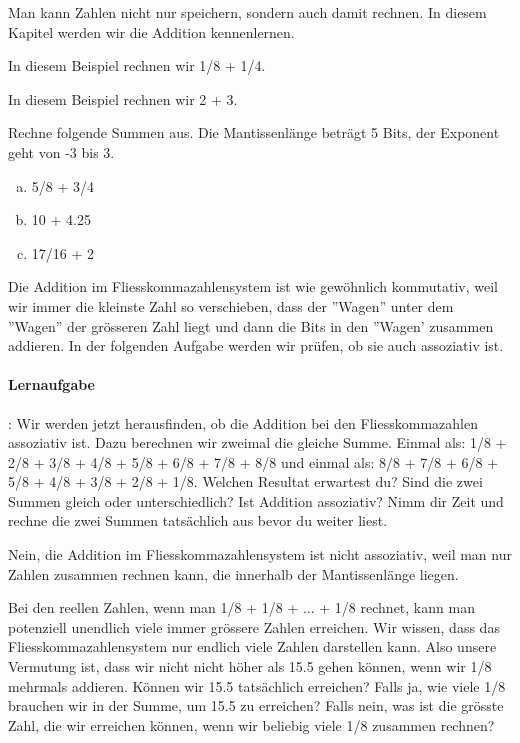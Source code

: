 Man kann Zahlen nicht nur speichern, sondern auch damit rechnen. In diesem Kapitel werden wir die Addition kennenlernen.

\begin{beispiel}
In diesem Beispiel rechnen wir 1/8 + 1/4.
\end{beispiel}

\begin{beispiel}
In diesem Beispiel rechnen wir 2 + 3.
\end{beispiel}

\begin{aufgabe}
Rechne folgende Summen aus. Die Mantissenlänge beträgt 5 Bits, der Exponent geht von -3 bis 3.
\begin{enumerate}[(a)]
\item 5/8 + 3/4
\item 10 + 4.25
\item 17/16 + 2
\end{enumerate}
\end{aufgabe}

Die Addition im Fliesskommazahlensystem ist wie gewöhnlich kommutativ, weil wir immer die kleinste Zahl so verschieben, dass der ''Wagen'' unter dem ''Wagen'' der grösseren Zahl liegt und dann die Bits in den ''Wagen' zusammen addieren. In der folgenden Aufgabe werden wir prüfen, ob sie auch assoziativ ist.

\paragraph{Lernaufgabe}:
Wir werden jetzt herausfinden, ob die Addition bei den Fliesskommazahlen assoziativ ist. Dazu berechnen wir zweimal die gleiche Summe.
Einmal als: 1/8 + 2/8 + 3/8 + 4/8 + 5/8 + 6/8 + 7/8 + 8/8 und einmal als: 8/8 + 7/8 + 6/8 + 5/8 + 4/8 + 3/8 + 2/8 + 1/8.
Welchen Resultat erwartest du?
Sind die zwei Summen gleich oder unterschiedlich?
Ist Addition assoziativ?
Nimm dir Zeit und rechne die zwei Summen tatsächlich aus bevor du weiter liest.

Nein, die Addition im Fliesskommazahlensystem ist nicht assoziativ, weil man nur Zahlen zusammen rechnen kann, die innerhalb der Mantissenlänge liegen.

\begin{aufgabe}
Bei den reellen Zahlen, wenn man 1/8 + 1/8 + ... + 1/8 rechnet, kann man potenziell unendlich viele immer grössere Zahlen erreichen. Wir wissen, dass das Fliesskommazahlensystem nur endlich viele Zahlen darstellen kann. Also unsere Vermutung ist, dass wir nicht nicht höher als 15.5 gehen können, wenn wir 1/8 mehrmals addieren.
Können wir 15.5 tatsächlich erreichen?
Falls ja, wie viele 1/8 brauchen wir in der Summe, um 15.5 zu erreichen?
Falls nein, was ist die grösste Zahl, die wir erreichen können, wenn wir beliebig viele 1/8 zusammen rechnen?
\end{aufgabe}

